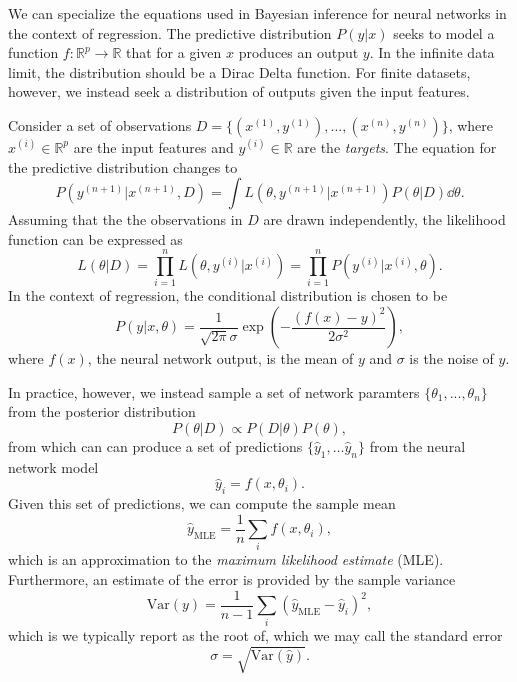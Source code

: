 We can specialize the equations used in Bayesian inference for neural networks in the context of regression.
The predictive distribution $P(y|x)$ seeks to model a function $f : \mathbb{R}^p \to \mathbb{R}$ that for a given $x$ produces an output $y$. In the infinite data limit, the distribution should be a Dirac Delta function. For finite datasets, however, we instead seek a distribution of outputs given the input features.

Consider a set of observations $D = \{(x^{(1)}, y^{(1)}), ..., (x^{(n)}, y^{(n)})\}$, where $x^{(i)} \in \mathbb{R}^p$ are the input features and $y^{(i)} \in \mathbb{R}$ are the \textit{targets}. The equation for the predictive distribution changes to
\begin{equation}
  P(y^{(n+1)}|x^{(n+1)}, D) = \int L(\theta, y^{(n+1)}|x^{(n+1)})P(\theta|D)\dd \theta.
\end{equation}
Assuming that the the observations in $D$ are drawn independently, the likelihood function can be expressed as
\begin{equation}
  L(\theta|D) = \prod_{i=1}^n L(\theta, y^{(i)}|x^{(i)}) = \prod_{i=1}^n P(y^{(i)}|x^{(i)}, \theta).
\end{equation}
In the context of regression, the conditional distribution is chosen to be
\begin{equation}
  P(y|x, \theta) = \frac{1}{\sqrt{2\pi}\sigma}\exp\left(-\frac{(f(x) - y)^2}{2\sigma^2}\right),
\end{equation}
where $f(x)$, the neural network output, is the mean of $y$ and $\sigma$ is the noise of $y$.

In practice, however, we instead sample a set of network paramters $\{\theta_1, ..., \theta_n\}$ from the posterior distribution
\begin{equation}
  P(\theta|D) \propto P(D|\theta)P(\theta),
\end{equation}
from which can can produce a set of predictions $\{\hat{y}_1,\ldots \hat{y}_n\}$ from the neural network model 
\begin{equation}
  \hat{y}_i = f(x, \theta_i).
\end{equation}
Given this set of predictions, we can compute the sample mean
\begin{equation}
  \hat{y}_\text{MLE} = \frac{1}{n}\sum_i f(x, \theta_i),
\end{equation}
which is an approximation to the \textit{maximum likelihood estimate} (MLE). Furthermore, an estimate of the error is provided by the sample variance
\begin{equation}
  \text{Var} (y) = \frac{1}{n-1}\sum_i (\hat{y}_\text{MLE} - \hat{y}_i)^2,
\end{equation}
which is we typically report as the root of, which we may call the standard error
\begin{equation}
  \sigma = \sqrt{\text{Var}(\hat{y})}.
\end{equation}

